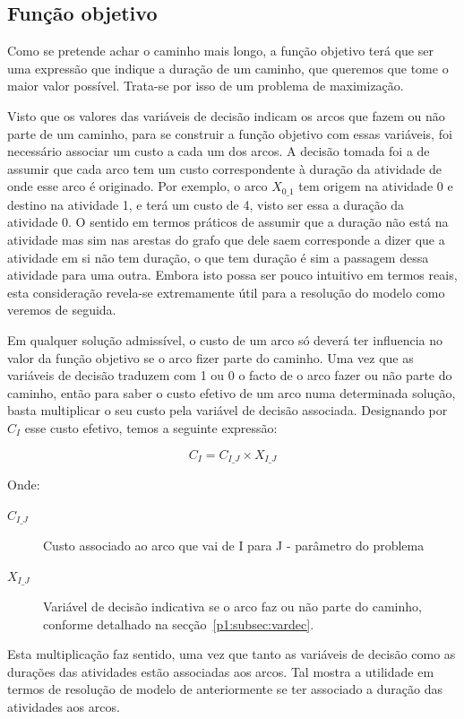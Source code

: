 \subsection{Função objetivo}

Como se pretende achar o caminho mais longo, a função objetivo terá que ser uma
expressão que indique a duração de um caminho, que queremos que tome o maior
valor possível. Trata-se por isso de um problema de maximização.

Visto que os valores das variáveis de decisão indicam os arcos que fazem ou não
parte de um caminho, para se construir a função objetivo com essas variáveis,
foi necessário associar um custo a cada um dos arcos. A decisão tomada foi a de
assumir que cada arco tem um custo correspondente à duração da atividade de onde
esse arco é originado. Por exemplo, o arco $X_{0\_1}$ tem origem na atividade
0 e destino na atividade 1, e terá um custo de 4, visto ser essa a duração da
atividade 0. O sentido em termos práticos de assumir que a duração não está na atividade mas sim nas arestas do grafo que dele saem  corresponde a dizer que a atividade em si não tem duração, o que tem duração é sim a passagem dessa atividade para uma outra. Embora isto possa ser pouco intuitivo em termos reais, esta consideração revela-se extremamente útil para a resolução do modelo como veremos de seguida.

Em qualquer solução admissível, o custo de um arco só deverá ter influencia no
valor da função objetivo se o arco fizer parte do caminho. Uma vez que as
variáveis de decisão traduzem com 1 ou 0 o facto de o arco fazer ou não parte do
caminho, então para saber o custo efetivo de um arco numa determinada solução,
basta multiplicar o seu custo pela variável de decisão associada. Designando por $C_{I}$ esse custo efetivo, temos a seguinte expressão:

\begin{displaymath}
C_{I} = C_{I\_J} \times X_{I\_J}
\end{displaymath}

Onde:
\begin{description}
	\item[$C_{I\_J}$] Custo associado ao arco que vai de I para J - parâmetro do problema
	\item[$X_{I\_J}$] Variável de decisão indicativa se o arco faz ou não parte do
	caminho, conforme detalhado na secção~\ref{p1:subsec:vardec}.
\end{description}

Esta multiplicação faz sentido, uma vez que tanto as variáveis de decisão como as durações das atividades estão associadas aos arcos. Tal mostra a utilidade em termos de resolução de modelo de anteriormente se ter associado a duração das atividades aos arcos.

